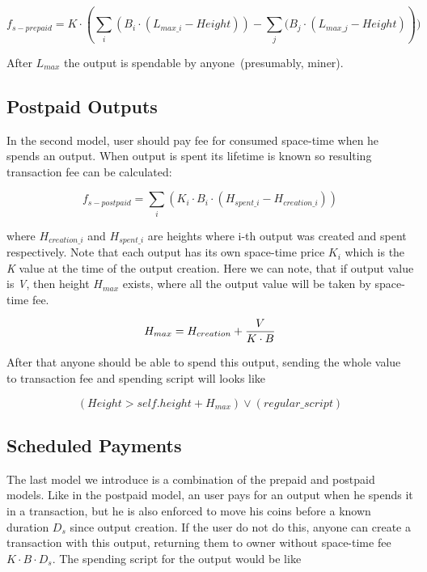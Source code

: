 \documentclass[]{article}   %
\begin{document}
\begin{equation}
f_{s-prepaid} = K \cdot (\sum_i{(B_i \cdot (L_{max\_i} - Height))} - \sum_j{(B_j \cdot (L_{max\_j} - Height)}))
\end{equation}

After $L_{max}$ the output is spendable by anyone~(presumably, miner).

\subsection{Postpaid Outputs}
\label{sec-postpaid}


In the second model, user should pay fee for consumed space-time when he spends an output. When output is spent its lifetime is known so resulting transaction fee can be calculated:

\begin{equation}
f_{s-postpaid} = \sum_i{(K_i \cdot B_i \cdot (H_{spent\_i} - H_{creation\_i}))}
\end{equation}

where $H_{creation\_i}$ and $H_{spent\_i}$ are heights where i-th output was created and spent respectively. Note that each output has its own space-time price \textit{$K_i$} which is the \textit{K} value at the time of the output creation. Here we can note, that if output value is \textit{V}, then height \textit{$H_{max}$} exists, where all the output value will be taken by space-time fee.

\begin{equation}
H_{max} = {H_{creation} + {V \over {K \cdot B}}}
\end{equation}

After that anyone should be able to spend this output, sending the whole value to transaction fee and spending script will looks like

\begin{equation}
(Height > self.height + H_{max}) \lor (regular\_script)
\end{equation}

\subsection{Scheduled Payments}
\label{sec-scheduled}

The last model we introduce is a combination of the prepaid and postpaid models. Like in the postpaid model, an user pays for an output when he spends it in a transaction, but he is also enforced to move his coins before a known duration $D_{s}$ since output creation. If the user do not do this, anyone can create a transaction with this output, returning them to owner without space-time fee ${K \cdot B \cdot D_{s}}$. The spending script for the output would be like
\end{document}
